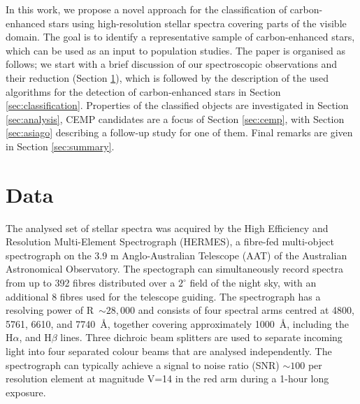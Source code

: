 In this work, we propose a novel approach for the classification of carbon-enhanced stars using high-resolution stellar spectra covering parts of the visible domain. The goal is to identify a representative sample of carbon-enhanced stars, which can be used as an input to population studies. The paper is organised as follows; we start with a brief discussion of our spectroscopic observations and their reduction (Section \ref{sec:data}), which is followed by the description of the used algorithms for the detection of carbon-enhanced stars in Section \ref{sec:classification}. Properties of the classified objects are investigated in Section \ref{sec:analysis}, CEMP candidates are a focus of Section \ref{sec:cemp}, with Section \ref{sec:asiago} describing a follow-up study for one of them. Final remarks are given in Section \ref{sec:summary}.

\section{Data}
\label{sec:data}
The analysed set of stellar spectra was acquired by the High Efficiency and Resolution Multi-Element Spectrograph (HERMES), a fibre-fed multi-object spectrograph on the $3.9$ m Anglo-Australian Telescope (AAT) of the Australian Astronomical Observatory. The spectograph \citep{2010SPIE.7735E..09B, 2015JATIS...1c5002S} can simultaneously record spectra from up to 392 fibres distributed over a $2^\circ$ field of the night sky, with an additional 8 fibres used for the telescope guiding. The spectrograph has a resolving power of R~$\sim28,000$ and consists of four spectral arms centred at 4800, 5761, 6610, and 7740~\AA, together covering approximately 1000~\AA, including the H$\alpha$, and H$\beta$ lines. Three dichroic beam splitters are used to separate incoming light into four separated colour beams that are analysed independently. The spectrograph can typically achieve a signal to noise ratio (SNR) $\sim100$ per resolution element at magnitude V=14 in the red arm during a 1-hour long exposure. 

